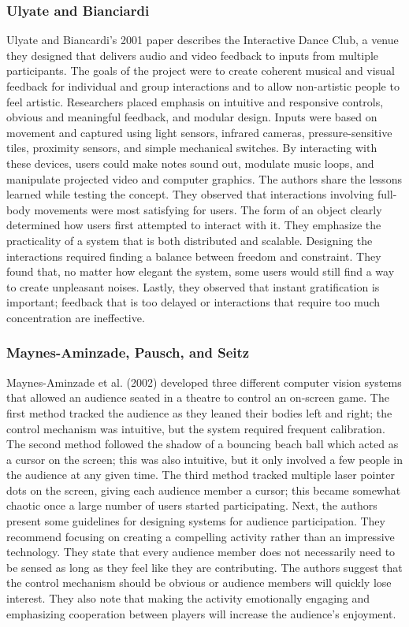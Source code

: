 \subsubsection{Ulyate and Bianciardi}

Ulyate and Biancardi's 2001 paper describes the Interactive Dance Club, a venue they designed that delivers audio and video feedback to inputs from multiple participants. The goals of the project were to create coherent musical and visual feedback for individual and group interactions and to allow non-artistic people to feel artistic. Researchers placed emphasis on intuitive and responsive controls, obvious and meaningful feedback, and modular design. Inputs were based on movement and captured using light sensors, infrared cameras, pressure-sensitive tiles, proximity sensors, and simple mechanical switches. By interacting with these devices, users could make notes sound out, modulate music loops, and manipulate projected video and computer graphics. The authors share the lessons learned while testing the concept. They observed that interactions involving full-body movements were most satisfying for users. The form of an object clearly determined how users first attempted to interact with it. They emphasize the practicality of a system that is both distributed and scalable. Designing the interactions required finding a balance between freedom and constraint. They found that, no matter how elegant the system, some users would still find a way to create unpleasant noises. Lastly, they observed that instant gratification is important; feedback that is too delayed or interactions that require too much concentration are ineffective.

\subsubsection{Maynes-Aminzade, Pausch, and Seitz}

Maynes-Aminzade et al. (2002) developed three different computer vision systems that allowed an audience seated in a theatre to control an on-screen game. The first method tracked the audience as they leaned their bodies left and right; the control mechanism was intuitive, but the system required frequent calibration. The second method followed the shadow of a bouncing beach ball which acted as a cursor on the screen; this was also intuitive, but it only involved a few people in the audience at any given time. The third method tracked multiple laser pointer dots on the screen, giving each audience member a cursor; this became somewhat chaotic once a large number of users started participating. Next, the authors present some guidelines for designing systems for audience participation. They recommend focusing on creating a compelling activity rather than an impressive technology. They state that every audience member does not necessarily need to be sensed as long as they feel like they are contributing. The authors suggest that the control mechanism should be obvious or audience members will quickly lose interest. They also note that making the activity emotionally engaging and emphasizing cooperation between players will increase the audience's enjoyment.

